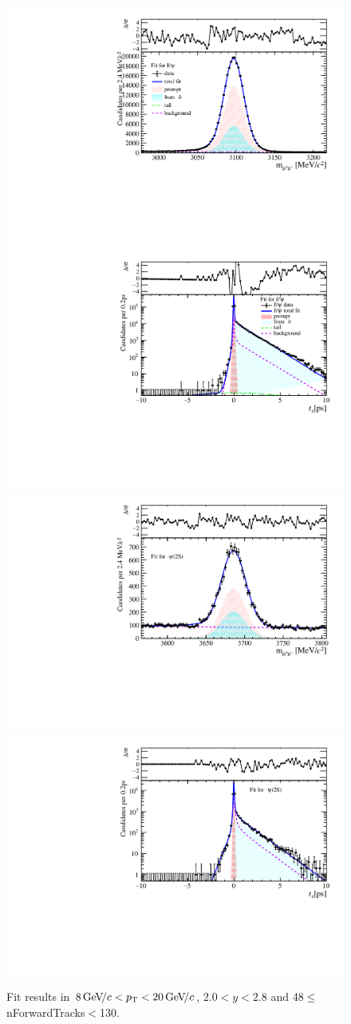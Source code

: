 \begin{figure}[H]
\begin{center}
\includegraphics[width=0.47\linewidth]{pdf/Jpsi/drawmassF/n5y1pt5.pdf}
\includegraphics[width=0.47\linewidth]{pdf/Jpsi/2DFitF/n5y1pt5.pdf}
\vspace*{-0.5cm}
\includegraphics[width=0.47\linewidth]{pdf/Psi2S/drawmassF/n5y1pt5.pdf}
\includegraphics[width=0.47\linewidth]{pdf/Psi2S/2DFitF/n5y1pt5.pdf}
\vspace*{-0.5cm}
\end{center}
\caption{Fit results in $8\text{\,Ge\kern -0.1em V\!/}c<p_{\mathrm{T}}<20\text{\,Ge\kern -0.1em V\!/}c$, $2.0<y<2.8$ and 48$\leq$nForwardTracks$<$130.}
\label{Fitn5y1pt5}
\end{figure}
